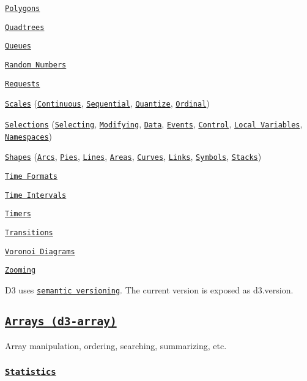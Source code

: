 \begin{DoxyItemize}
\item \href{#polygons-d3-polygon}{\tt Polygons}
\item \href{#quadtrees-d3-quadtree}{\tt Quadtrees}
\item \href{#queues-d3-queue}{\tt Queues}
\item \href{#random-numbers-d3-random}{\tt Random Numbers}
\item \href{#requests-d3-request}{\tt Requests}
\item \href{#scales-d3-scale}{\tt Scales} (\href{#continuous-scales}{\tt Continuous}, \href{#sequential-scales}{\tt Sequential}, \href{#quantize-scales}{\tt Quantize}, \href{#ordinal-scales}{\tt Ordinal})
\item \href{#selections-d3-selection}{\tt Selections} (\href{#selecting-elements}{\tt Selecting}, \href{#modifying-elements}{\tt Modifying}, \href{#joining-data}{\tt Data}, \href{#handling-events}{\tt Events}, \href{#control-flow}{\tt Control}, \href{#local-variables}{\tt Local Variables}, \href{#namespaces}{\tt Namespaces})
\item \href{#shapes-d3-shape}{\tt Shapes} (\href{#arcs}{\tt Arcs}, \href{#pies}{\tt Pies}, \href{#lines}{\tt Lines}, \href{#areas}{\tt Areas}, \href{#curves}{\tt Curves}, \href{#links}{\tt Links}, \href{#symbols}{\tt Symbols}, \href{#stacks}{\tt Stacks})
\item \href{#time-formats-d3-time-format}{\tt Time Formats}
\item \href{#time-intervals-d3-time}{\tt Time Intervals}
\item \href{#timers-d3-timer}{\tt Timers}
\item \href{#transitions-d3-transition}{\tt Transitions}
\item \href{#voronoi-diagrams-d3-voronoi}{\tt Voronoi Diagrams}
\item \href{#zooming-d3-zoom}{\tt Zooming}
\end{DoxyItemize}

D3 uses \href{http://semver.org/}{\tt semantic versioning}. The current version is exposed as d3.\+version.

\subsection*{\href{https://github.com/d3/d3-array}{\tt Arrays (d3-\/array)}}

Array manipulation, ordering, searching, summarizing, etc.

\subsubsection*{\href{https://github.com/d3/d3-array/blob/master/README.md#statistics}{\tt Statistics}}

